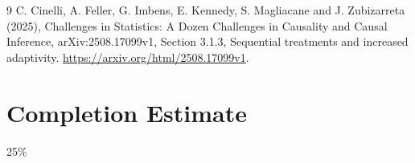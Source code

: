 \documentclass[11pt]{article}
\theoremstyle{remark}
\begin{document}
\begin{thebibliography}{9}
 C. Cinelli, A. Feller, G. Imbens, E. Kennedy,
S. Magliacane and J. Zubizarreta (2025), Challenges in Statistics:
A Dozen Challenges in Causality and Causal Inference, arXiv:2508.17099v1,
Section 3.1.3, Sequential treatments and increased adaptivity.
\url{https://arxiv.org/html/2508.17099v1}.
\end{thebibliography}

\section{Completion Estimate}
25\%
\end{document}
